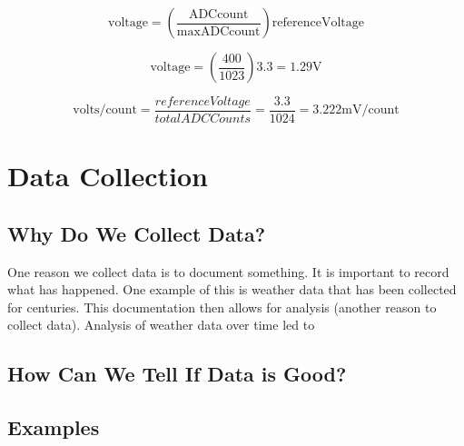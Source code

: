 \begin{equation}
	\label{eq:adc2volt}
	\mathrm{voltage} = \left(\frac{\mathrm{ADCcount}}{\mathrm{maxADCcount}}\right)\mathrm{referenceVoltage}
\end{equation}

\begin{equation}
	\label{eq:adc2voltex}
	\mathrm{voltage} = \left(\frac{400}{1023}\right)3.3 = 1.29\mathrm{V}
\end{equation}

\begin{equation}
	\label{eq:adcpercount}
	\mathrm{volts/count} = \frac{referenceVoltage}{totalADCCounts} = \frac{3.3}{1024} = 3.222\mathrm{mV}/\mathrm{count}
\end{equation}


\section{Data Collection}

\subsection{Why Do We Collect Data?}
One reason we collect data is to document something. It is important to record what has happened. One example of this 
is weather data that has been collected for centuries. This documentation then allows for analysis (another reason to 
collect data). Analysis of weather data over time led to 

\subsection{How Can We Tell If Data is Good?}

\subsection{Examples}

